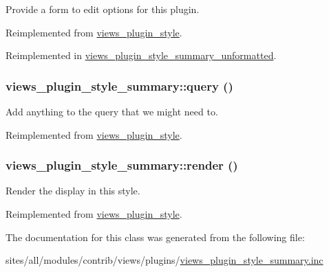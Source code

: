 Provide a form to edit options for this plugin. 

Reimplemented from \hyperlink{classviews__plugin__style_fe3d437ff4398315b15c4e60975dbb1c}{views\_\-plugin\_\-style}.

Reimplemented in \hyperlink{classviews__plugin__style__summary__unformatted_8770285dac047bf88a2c77b2e798826d}{views\_\-plugin\_\-style\_\-summary\_\-unformatted}.\hypertarget{classviews__plugin__style__summary_fd8f02a61bd0e1887cc7767950e8e0df}{
\subsubsection[{query}]{\setlength{\rightskip}{0pt plus 5cm}views\_\-plugin\_\-style\_\-summary::query ()}}
\label{classviews__plugin__style__summary_fd8f02a61bd0e1887cc7767950e8e0df}


Add anything to the query that we might need to. 

Reimplemented from \hyperlink{classviews__plugin__style_f6b601d8f42cc3d86721fcad76eaae4b}{views\_\-plugin\_\-style}.\hypertarget{classviews__plugin__style__summary_240be31b796b50331a25cf30818e584f}{
\subsubsection[{render}]{\setlength{\rightskip}{0pt plus 5cm}views\_\-plugin\_\-style\_\-summary::render ()}}
\label{classviews__plugin__style__summary_240be31b796b50331a25cf30818e584f}


Render the display in this style. 

Reimplemented from \hyperlink{classviews__plugin__style_a52b618e91b11a7d10ad1feadbc891f1}{views\_\-plugin\_\-style}.

The documentation for this class was generated from the following file:\begin{CompactItemize}
\item 
sites/all/modules/contrib/views/plugins/\hyperlink{views__plugin__style__summary_8inc}{views\_\-plugin\_\-style\_\-summary.inc}\end{CompactItemize}
